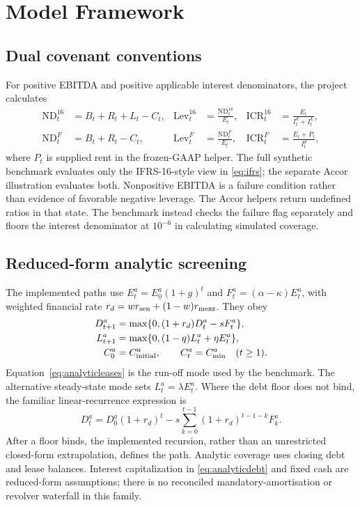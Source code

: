 \documentclass[11pt,a4paper]{article}
\newcommand{\ND}{\mathrm{ND}} %
\newcommand{\ICR}{\mathrm{ICR}}
\newcommand{\Lev}{\mathrm{Lev}}
\theoremstyle{plain}
\theoremstyle{definition}
\begin{document}
\section{Model Framework}
\subsection{Dual covenant conventions}
For positive EBITDA and positive applicable interest denominators, the project
calculates
\begin{align}
\ND_t^{16}&=B_t+R_t+L_t-C_t,&
\Lev_t^{16}&=\frac{\ND_t^{16}}{E_t},&
\ICR_t^{16}&=\frac{E_t}{I_t^d+I_t^L},\label{eq:ifrs}\\
\ND_t^{F}&=B_t+R_t-C_t,&
\Lev_t^{F}&=\frac{\ND_t^{F}}{E_t},&
\ICR_t^{F}&=\frac{E_t+P_t}{I_t^d},\label{eq:frozen}
\end{align}
where $P_t$ is supplied rent in the frozen-GAAP helper. The full synthetic benchmark
evaluates only the IFRS-16-style view in \eqref{eq:ifrs}; the separate Accor
illustration evaluates both. Nonpositive EBITDA is a failure condition rather than
evidence of favorable negative leverage. The Accor helpers return undefined ratios
in that state. The benchmark instead checks the failure flag separately and floors
the interest denominator at $10^{-6}$ in calculating simulated coverage.

\subsection{Reduced-form analytic screening}
The implemented paths use $E_t^a=E_0^a(1+g)^t$ and
$F_t^a=(\alpha-\kappa)E_t^a$, with weighted financial rate
$r_d=w r_{\rm sen}+(1-w)r_{\rm mezz}$. They obey
\begin{align}
D_{t+1}^a&=\max\{0,(1+r_d)D_t^a-sF_t^a\},\label{eq:analyticdebt}\\
L_{t+1}^a&=\max\{0,(1-q)L_t^a+\eta E_t^a\},\label{eq:analyticleases}\\
C_0^a&=C_{\rm initial}^a,\qquad C_t^a=C_{\min}^a\quad(t\ge1).
\end{align}
Equation~\eqref{eq:analyticleases} is the run-off mode used by the benchmark.
The alternative steady-state mode sets $L_t^a=\lambda E_t^a$. Where the debt floor
does not bind, the familiar linear-recurrence expression is
\begin{equation}
D_t^a=D_0^a(1+r_d)^t-s\sum_{k=0}^{t-1}(1+r_d)^{t-1-k}F_k^a.
\label{eq:closedform}
\end{equation}
After a floor binds, the implemented recursion, rather than an unrestricted
closed-form extrapolation, defines the path. Analytic coverage uses closing debt
and lease balances. Interest capitalization in \eqref{eq:analyticdebt} and fixed
cash are reduced-form assumptions; there is no reconciled mandatory-amortisation
or revolver waterfall in this family.
\end{document}
